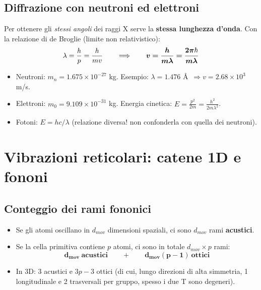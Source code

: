 \subsection{Diffrazione con neutroni ed elettroni}
Per ottenere gli \emph{stessi angoli} dei raggi X serve la \textbf{stessa lunghezza d'onda}. Con la relazione di de Broglie (limite non relativistico):
\[ \lambda = \frac{h}{p} = \frac{h}{m v} \qquad\Longrightarrow\qquad
   \bm{v = \frac{h}{m\lambda} = \frac{2\pi\hbar}{m\lambda}} \]
\begin{itemize}
  \item Neutroni: $m_n = 1.675\times10^{-27}$ kg. Esempio: $\lambda = 1.476$ \AA\ $\Rightarrow v = 2.68\times10^3$ m/s.
  \item Elettroni: $m_0 = 9.109\times10^{-31}$ kg. Energia cinetica: $E = \frac{p^2}{2m} = \frac{h^2}{2m\lambda^2}$.
  \item Fotoni: $E = hc/\lambda$ (relazione diversa! non confonderla con quella dei neutroni).
\end{itemize}

\newpage

\section{Vibrazioni reticolari: catene 1D e fononi}

\subsection{Conteggio dei rami fononici}
\begin{itemize}
  \item Se gli atomi oscillano in $d_{mov}$ dimensioni spaziali, ci sono $d_{mov}$ rami \textbf{acustici}.
  \item Se la cella primitiva contiene $p$ atomi, ci sono in totale $d_{mov}\times p$ rami:
  \[ \bm{d_{mov}\ \text{acustici} \qquad + \qquad d_{mov}(p-1)\ \text{ottici}} \]
  \item In 3D: 3 acustici e $3p-3$ ottici (di cui, lungo direzioni di alta simmetria, 1 longitudinale e 2 trasversali per gruppo, spesso i due T sono degeneri).
\end{itemize}


